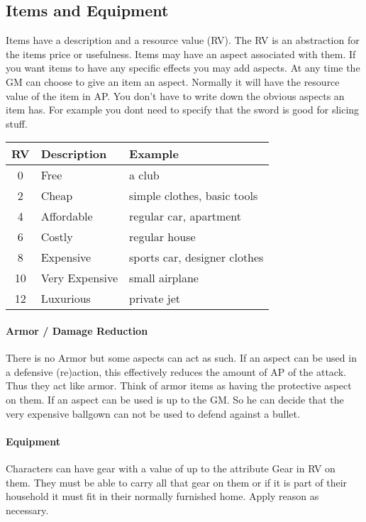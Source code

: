 \documentclass[11pt]{article}
\begin{document}
{\subsection{Items and Equipment}
\label{sec:orgbf8332f}
Items have a description and a resource value (RV). The RV is an abstraction for the items price or usefulness. 
Items may have an aspect associated with them. If you want items to have any specific effects you may add aspects. At any time the GM can choose to give an item an aspect. Normally it will have the resource value of the item in AP. You don't have to write down the obvious aspects an item has. For example you dont need to specify that the sword is good for slicing stuff.

\begin{center}
\begin{tabular}{c|l|l}
\textbf{RV} & \textbf{Description} & \textbf{Example}\\[0pt]
\hline
0 & Free & a club\\[0pt]
2 & Cheap & simple clothes, basic tools\\[0pt]
4 & Affordable & regular car, apartment\\[0pt]
6 & Costly & regular house\\[0pt]
8 & Expensive & sports car, designer clothes\\[0pt]
10 & Very Expensive & small airplane\\[0pt]
12 & Luxurious & private jet\\[0pt]
\end{tabular}
\end{center}

\paragraph*{Armor / Damage Reduction}
\label{sec:orgef777fd}
There is no Armor but some aspects can act as such. If an aspect can be used in a defensive (re)action, this effectively reduces the amount of AP of the attack. Thus they act like armor. Think of armor items as having the protective aspect on them. If an aspect can be used is up to the GM. So he can decide that the very expensive ballgown can not be used to defend against a bullet.

\paragraph*{Equipment}
\label{sec:org77c0f9e}
Characters can have gear with a value of up to the attribute Gear in RV on them. They must be able to carry all that gear on them or if it is part of their household it must fit in their normally furnished home. Apply reason as necessary.

}
\end{document}
